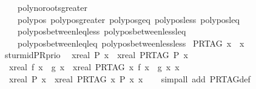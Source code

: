 \begin{isabellebody}
\ \ \ \ poly{\isacharunderscore}no{\isacharunderscore}roots{\isacharunderscore}greater\isanewline
\ \ \ \ poly{\isacharunderscore}pos\ poly{\isacharunderscore}pos{\isacharunderscore}greater\ poly{\isacharunderscore}pos{\isacharunderscore}geq\ poly{\isacharunderscore}pos{\isacharunderscore}less\ poly{\isacharunderscore}pos{\isacharunderscore}leq\isanewline
\ \ \ \ poly{\isacharunderscore}pos{\isacharunderscore}between{\isacharunderscore}leq{\isacharunderscore}less\ poly{\isacharunderscore}pos{\isacharunderscore}between{\isacharunderscore}less{\isacharunderscore}leq\isanewline
\ \ \ \ poly{\isacharunderscore}pos{\isacharunderscore}between{\isacharunderscore}leq{\isacharunderscore}leq\ poly{\isacharunderscore}pos{\isacharunderscore}between{\isacharunderscore}less{\isacharunderscore}less\isanewline
\isanewline
\isanewline
\isanewline
{}\isamarkupfalse%
\ {\isachardoublequoteopen}PR{\isacharunderscore}TAG\ x\ {\isasymequiv}\ x{\isachardoublequoteclose}\isanewline
\isanewline
{}\isamarkupfalse%
\ sturm{\isacharunderscore}id{\isacharunderscore}PR{\isacharunderscore}prio{}{\isacharcolon}\isanewline
\ \ {\isachardoublequoteopen}{\isacharbraceleft}x{\isacharcolon}{\isacharcolon}real{\isachardot}\ P\ x{\isacharbraceright}\ {\isacharequal}\ {\isacharbraceleft}x{\isacharcolon}{\isacharcolon}real{\isachardot}\ {\isacharparenleft}PR{\isacharunderscore}TAG\ P{\isacharparenright}\ x{\isacharbraceright}{\isachardoublequoteclose}\isanewline
\ \ {\isachardoublequoteopen}{\isacharparenleft}{\isasymforall}x{\isacharcolon}{\isacharcolon}real{\isachardot}\ f\ x\ {\isacharless}\ g\ x{\isacharparenright}\ {\isacharequal}\ {\isacharparenleft}{\isasymforall}x{\isacharcolon}{\isacharcolon}real{\isachardot}\ PR{\isacharunderscore}TAG\ {\isacharparenleft}{\isasymlambda}x{\isachardot}\ f\ x\ {\isacharless}\ g\ x{\isacharparenright}\ x{\isacharparenright}{\isachardoublequoteclose}\isanewline
\ \ {\isachardoublequoteopen}{\isacharparenleft}{\isasymforall}x{\isacharcolon}{\isacharcolon}real{\isachardot}\ P\ x{\isacharparenright}\ {\isacharequal}\ {\isacharparenleft}{\isasymforall}x{\isacharcolon}{\isacharcolon}real{\isachardot}\ {\isasymnot}{\isacharparenleft}PR{\isacharunderscore}TAG\ {\isacharparenleft}{\isasymlambda}x{\isachardot}\ {\isasymnot}P\ x{\isacharparenright}{\isacharparenright}\ x{\isacharparenright}{\isachardoublequoteclose}\isanewline
%
\isadelimproof
\ \ %
\endisadelimproof
%
\isatagproof
{}\isamarkupfalse%
\ {\isacharparenleft}simp{\isacharunderscore}all\ add{\isacharcolon}\ PR{\isacharunderscore}TAG{\isacharunderscore}def{\isacharparenright}%

\end{isabellebody}

